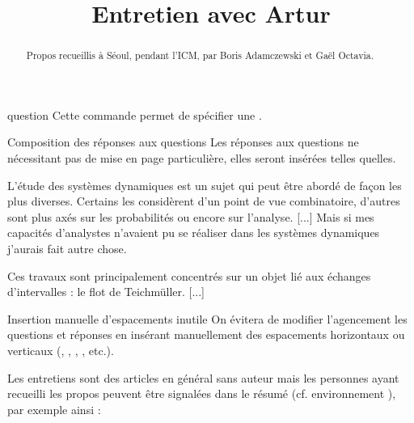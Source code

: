 \begin{docCommand}{question}{}
  Cette commande permet de spécifier une .
\end{docCommand}

\begin{dbremark}{Composition des réponses aux questions}{}
  Les réponses aux questions ne nécessitant pas de mise en page particulière,
  elles seront insérées telles quelles.
\end{dbremark}

\begin{bodycode}

  L'étude des systèmes dynamiques est un sujet qui peut être abordé de façon les
  plus diverses.  Certains les considèrent d'un point de vue combinatoire,
  d'autres sont plus axés sur les probabilités ou encore sur l'analyse. [...]
  Mais si mes capacités d'analystes n'avaient pu se réaliser dans les systèmes
  dynamiques j'aurais fait autre chose.


  Ces travaux sont principalement concentrés sur un objet lié aux échanges
  d'intervalles : le flot de Teichmüller. [...]
\end{bodycode}

\begin{dbwarning}{Insertion manuelle d'espacements inutile}{}
  On évitera de modifier l'agencement les questions et réponses en insérant
  manuellement des espacements horizontaux ou verticaux
  (, , ,
  , etc.).
\end{dbwarning}

Les entretiens sont des articles en général sans auteur mais les personnes ayant
recueilli les propos peuvent être signalées dans le résumé (cf. environnement
), par exemple ainsi :

\begin{bodycode}
  \title{Entretien avec Artur }
  \begin{abstract}
    Propos recueillis à Séoul, pendant l'ICM, par Boris Adamczewski et Gaël
    Octavia.
  \end{abstract}
  \maketitle
\end{bodycode}

